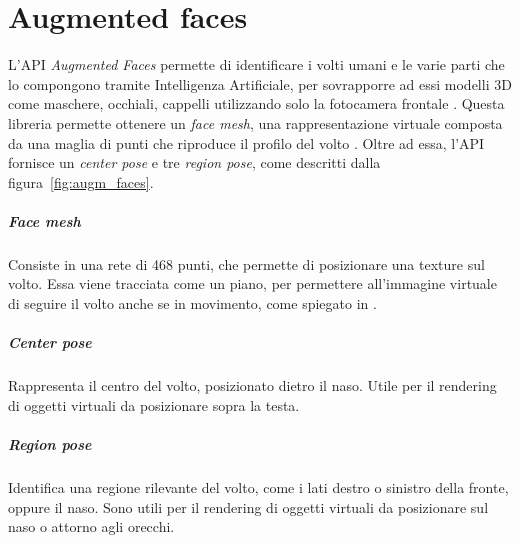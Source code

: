 \documentclass[crop=false, class=book]{standalone}
\begin{document}
	\chapter{Augmented faces}
	L'API \textit{Augmented Faces} permette di identificare i volti umani e le varie parti che lo compongono tramite Intelligenza Artificiale, per sovrapporre ad essi modelli 3D come maschere, occhiali, cappelli utilizzando solo la fotocamera frontale \cite{google2022faces}. 
	Questa libreria permette ottenere un \textit{face mesh}, una rappresentazione virtuale composta da una maglia di punti che riproduce il profilo del volto \cite{oufqir2020arkit}. Oltre ad essa, l'API fornisce un \textit{center pose} e tre \textit{region pose}, come descritti dalla figura~\vref{fig:augm_faces}.
	
	\paragraph*{Face mesh}
		Consiste in una rete di 468 punti, che permette di posizionare una texture sul volto. Essa viene tracciata come un piano, per permettere all'immagine virtuale di seguire il volto anche se in movimento, come spiegato in \cite{googleblog2019faces}.
	
	\paragraph*{Center pose}
		Rappresenta il centro del volto, posizionato dietro il naso. Utile per il rendering di oggetti virtuali da posizionare sopra la testa.
	
	\paragraph*{Region pose}
		Identifica una regione rilevante del volto, come i lati destro o sinistro della fronte, oppure il naso. Sono utili per il rendering di oggetti virtuali da posizionare sul naso o attorno agli orecchi.
	
\end{document}
